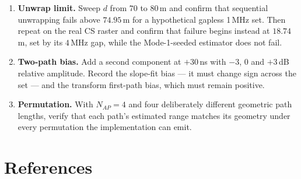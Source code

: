\documentclass[11pt,a4paper]{article}
\newcommand{\us}{\,\ensuremath{\upmu}s}
\newcommand{\Tipp}{T_{IP2}}
\newcommand{\Nap}{N_{AP}}
\providecommand{\upmu}{\mu}
\begin{document}
\begin{enumerate}[label=\textbf{B\arabic*.},leftmargin=2.6em,itemsep=2pt]
    at $\Tipp = 10\us$ to confirm the $\Delta T$ scaling.
  \item \textbf{Unwrap limit.} Sweep $d$ from $70$ to $80$\,m and confirm that sequential unwrapping
    fails above $74.95$\,m for a hypothetical gapless 1\,MHz set. Then repeat on the real CS raster
    and confirm that failure begins instead at $18.74$\,m, set by its $4$\,MHz gap, while the
    Mode-1-seeded estimator does not fail.
  \item \textbf{Two-path bias.} Add a second component at $+30$\,ns with $-3$, $0$ and $+3$\,dB
    relative amplitude. Record the slope-fit bias --- it must change sign across the set --- and the
    transform first-path bias, which must remain positive.
  \item \textbf{Permutation.} With $\Nap = 4$ and four deliberately different geometric path lengths,
    verify that each path's estimated range matches its geometry under every permutation the
    implementation can emit.
\end{enumerate}

\clearpage
\section*{References}
\end{document}
